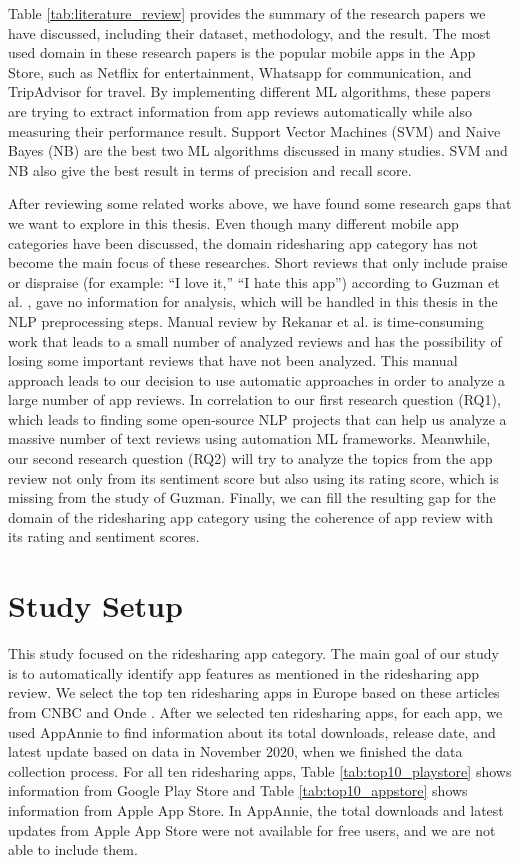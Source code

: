 \documentclass[12pt]{article}
\begin{document}
Table \ref{tab:literature_review} provides the summary of the research papers we have discussed, including their dataset, methodology, and the result. The most used domain in these research papers is the popular mobile apps in the App Store, such as Netflix for entertainment, Whatsapp for communication, and TripAdvisor for travel. By implementing different ML algorithms, these papers are trying to extract information from app reviews automatically while also measuring their performance result. Support Vector Machines (SVM) and Naive Bayes (NB) are the best two ML algorithms discussed in many studies. SVM and NB also give the best result in terms of precision and recall score.

After reviewing some related works above, we have found some research gaps that we want to explore in this thesis. Even though many different mobile app categories have been discussed, the domain ridesharing app category has not become the main focus of these researches. Short reviews that only include praise or dispraise (for example: “I love it,” “I hate this app”) according to Guzman et al. \cite{fine_grained}, gave no information for analysis, which will be handled in this thesis in the NLP preprocessing steps. Manual review by Rekanar et al. \cite{sentiment_analysis_hse_ireland} is time-consuming work that leads to a small number of analyzed reviews and has the possibility of losing some important reviews that have not been analyzed. This manual approach leads to our decision to use automatic approaches in order to analyze a large number of app reviews. In correlation to our first research question (RQ1), which leads to finding some open-source NLP projects that can help us analyze a massive number of text reviews using automation ML frameworks. Meanwhile, our second research question (RQ2) will try to analyze the topics from the app review not only from its sentiment score but also using its rating score, which is missing from the study of Guzman\cite{fine_grained}. Finally, we can fill the resulting gap for the domain of the ridesharing app category using the coherence of app review with its rating and sentiment scores.

\newpage
\section{Study Setup}
This study focused on the ridesharing app category. The main goal of our study is to automatically identify app features as mentioned in the ridesharing app review. We select the top ten ridesharing apps in Europe based on these articles from CNBC \cite{cnbc} and Onde \cite{onde}. After we selected ten ridesharing apps, for each app, we used AppAnnie to find information about its total downloads, release date, and latest update based on data in November 2020, when we finished the data collection process. For all ten ridesharing apps, Table \ref{tab:top10_playstore} shows information from Google Play Store and Table \ref{tab:top10_appstore} shows information from Apple App Store. In AppAnnie, the total downloads and latest updates from Apple App Store were not available for free users, and we are not able to include them.
\end{document}
